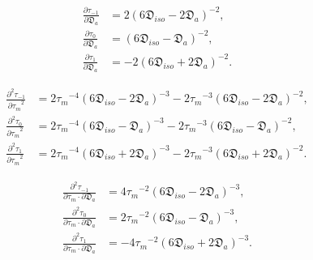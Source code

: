 \documentclass[a4paper,11pt,twoside,openright]{book}
\def\lthtmlcheckvsize{\ifdim\ht\sizebox<\vsize 
  \ifdim\wd\sizebox<\hsize\expandafter\hfill\fi \expandafter\vfill
  \else\expandafter\vss\fi}%
\begin{document}
{\newpage\clearpage
\setcounter{equation}{155}
%
\begin{subequations}\begin{align}
\frac{\partial \tau_{-1}}{\partial \mathfrak{D}_a} &= 2(6\mathfrak{D}_{iso} - 2\mathfrak{D}_a)^{-2}, \\
\frac{\partial \tau_{0}}{\partial \mathfrak{D}_a}  &= (6\mathfrak{D}_{iso} - \mathfrak{D}_a)^{-2}, \\
\frac{\partial \tau_{1}}{\partial \mathfrak{D}_a}  &= -2(6\mathfrak{D}_{iso} + 2\mathfrak{D}_a)^{-2}.
\end{align}\end{subequations}%
\lthtmldisplayZ
\lthtmlcheckvsize\clearpage}

{\newpage\clearpage
\setcounter{equation}{156}
%
\begin{subequations}\begin{align}
\frac{\partial^2 \tau_{-1}}{{\partial \tau_m}^2} &= 2{\tau_m}^{-4} (6\mathfrak{D}_{iso} - 2\mathfrak{D}_a)^{-3}
- 2{\tau_m}^{-3} (6\mathfrak{D}_{iso} - 2\mathfrak{D}_a)^{-2}, \\
\frac{\partial^2 \tau_{0}}{{\partial \tau_m}^2}  &= 2{\tau_m}^{-4} (6\mathfrak{D}_{iso} - \mathfrak{D}_a)^{-3}
- 2{\tau_m}^{-3} (6\mathfrak{D}_{iso} - \mathfrak{D}_a)^{-2}, \\
\frac{\partial^2 \tau_{1}}{{\partial \tau_m}^2}  &= 2{\tau_m}^{-4} (6\mathfrak{D}_{iso} + 2\mathfrak{D}_a)^{-3}
- 2{\tau_m}^{-3} (6\mathfrak{D}_{iso} + 2\mathfrak{D}_a)^{-2}.
\end{align}\end{subequations}%
\lthtmldisplayZ
\lthtmlcheckvsize\clearpage}

{\newpage\clearpage
\setcounter{equation}{157}
%
\begin{subequations}\begin{align}
\frac{\partial^2 \tau_{-1}}{\partial \tau_m \cdot \partial \mathfrak{D}_a} &= 4{\tau_m}^{-2} (6\mathfrak{D}_{iso} - 2\mathfrak{D}_a)^{-3}, \\
\frac{\partial^2 \tau_{0}}{\partial \tau_m \cdot \partial \mathfrak{D}_a}  &= 2{\tau_m}^{-2} (6\mathfrak{D}_{iso} - \mathfrak{D}_a)^{-3}, \\
\frac{\partial^2 \tau_{1}}{\partial \tau_m \cdot \partial \mathfrak{D}_a}  &= -4{\tau_m}^{-2} (6\mathfrak{D}_{iso} + 2\mathfrak{D}_a)^{-3}.
\end{align}\end{subequations}%
\lthtmldisplayZ
\lthtmlcheckvsize\clearpage}
\end{document}
